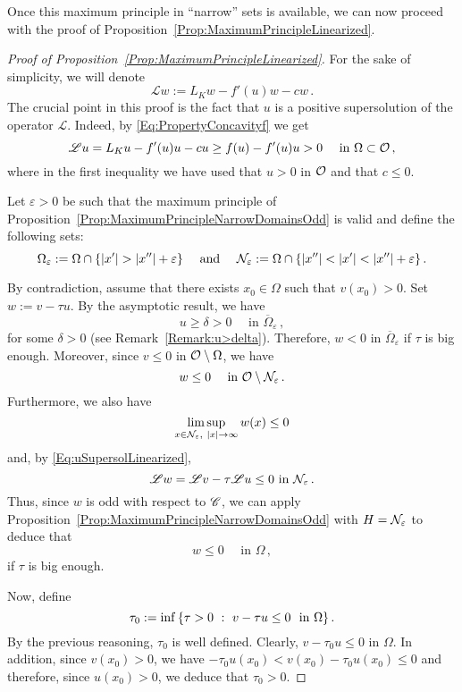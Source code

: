 Once this maximum principle in ``narrow'' sets is available, we can now proceed with the proof of Proposition~\ref{Prop:MaximumPrincipleLinearized}.

\begin{proof}[Proof of Proposition~\ref{Prop:MaximumPrincipleLinearized}]
    


	For the sake of simplicity, we will denote 
	$$
	\mathscr{L} w := L_K w - f'(u)w - cw\,.
	$$
	The crucial point in this proof is the fact that $u$ is a positive supersolution of the operator $\mathscr{L}$. Indeed, by \eqref{Eq:PropertyConcavityf} we get
	\begin{equation}
	\label{Eq:uSupersolLinearized}
	\mathscr{L} u = L_K u - f'(u)u - cu \geq f(u) - f'(u)u > 0 \quad \textrm{ in } \Omega \subset \mathcal{O}\,,
	\end{equation}
	where in the first inequality we have used that $u>0$ in $\mathcal{O}$ and that $c\leq 0$.
	
	Let $\varepsilon > 0$ be such that the maximum principle of Proposition~\ref{Prop:MaximumPrincipleNarrowDomainsOdd} is valid and define the following sets:
	$$
	\Omega_\varepsilon := \Omega \cap \{|x'| > |x''| + \varepsilon\}\quad \textrm{ and } \quad 
	\mathcal{N}_\varepsilon := \Omega \cap \{|x''| < |x'| < |x''| + \varepsilon\}\,.
	$$
	
	
    
    By contradiction, assume that there exists $x_0\in \Omega$ such that $v(x_0)> 0$.
	Set $w := v - \tau u$. By the asymptotic result, we have 
	\begin{equation}
		\label{Eq:u>delta}
		u \geq \delta > 0 \quad \textrm{ in } \overline{\Omega}_\varepsilon\,,
	\end{equation}
	for some $\delta >0$ (see Remark~\ref{Remark:u>delta}). Therefore,  $w < 0$ in $\overline{\Omega}_\varepsilon$ if $\tau$ is big enough. Moreover, since $v\leq 0$ in $\mathcal{O}\setminus\Omega$, we have 
	$$
	w \leq 0 \quad \textrm{ in } \mathcal{O} \setminus \mathcal{N}_\varepsilon\,.
	$$
	Furthermore, we also have
	$$
	\limsup_{x\in \mathcal{N}_\varepsilon, \ |x|\to \infty} w(x) \leq 0
	$$
	and, by \eqref{Eq:uSupersolLinearized},
	$$
	\mathscr{L} w = \mathscr{L} v - \tau \mathscr{L} u \leq 0 \textrm{ in } \mathcal{N}_\varepsilon\,.
	$$
	Thus, since $w$ is odd with respect to $\mathscr{C}$, we can apply Proposition~\ref{Prop:MaximumPrincipleNarrowDomainsOdd} with $H = \mathcal{N}_\varepsilon$ to deduce that
	$$
	w \leq 0 \quad \textrm{ in } \Omega\,,
	$$
	if $\tau$ is big enough.
	
	Now, define 
	$$
	\tau_0:= \inf \left \{ \tau > 0 \ : \ v - \tau u \leq 0 \ \textrm{ in } \Omega \right \}.
	$$
	By the previous reasoning, $\tau_0$ is well defined. Clearly, $v - \tau_0 u \leq 0 $ in $\Omega$. In addition, since $v(x_0)>0$, we have $-\tau_0 u(x_0) < v(x_0) - \tau_0 u (x_0) \leq 0$ and therefore, since $u(x_0)>0$, we deduce that  $\tau_0 > 0$.
	

\end{proof}

